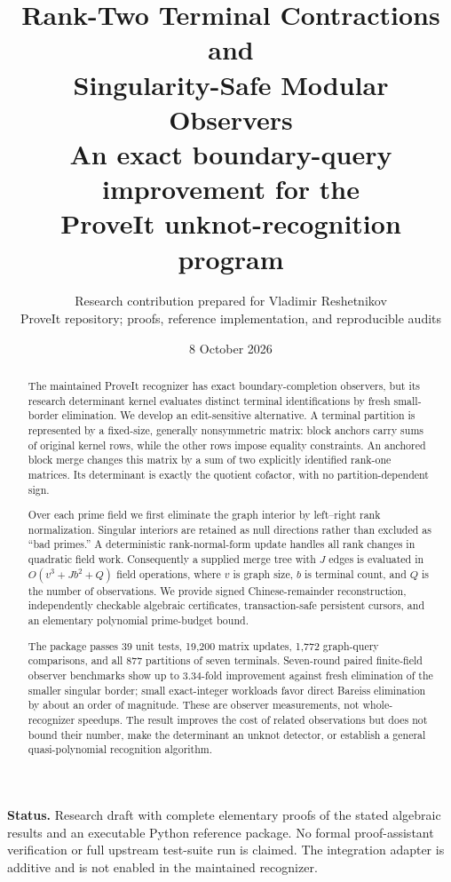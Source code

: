 \documentclass[11pt,letterpaper]{article}
\title{\textbf{Rank-Two Terminal Contractions and\\ Singularity-Safe Modular Observers}\\[0.5em]
\large An exact boundary-query improvement for the\\ ProveIt unknot-recognition program}
\author{Research contribution prepared for Vladimir Reshetnikov\\
\small ProveIt repository; proofs, reference implementation, and reproducible audits}
\date{8 October 2026}
\theoremstyle{definition}\newtheorem{definition}[theorem]{Definition}
\theoremstyle{remark}\newtheorem{remark}[theorem]{Remark}
\begin{document}
\maketitle
\begin{abstract}
The maintained ProveIt recognizer has exact boundary-completion observers, but its research determinant kernel evaluates distinct terminal identifications by fresh small-border elimination. We develop an edit-sensitive alternative. A terminal partition is represented by a fixed-size, generally nonsymmetric matrix: block anchors carry sums of original kernel rows, while the other rows impose equality constraints. An anchored block merge changes this matrix by a sum of two explicitly identified rank-one matrices. Its determinant is exactly the quotient cofactor, with no partition-dependent sign.

Over each prime field we first eliminate the graph interior by left--right rank normalization. Singular interiors are retained as null directions rather than excluded as ``bad primes.'' A deterministic rank-normal-form update handles all rank changes in quadratic field work. Consequently a supplied merge tree with $J$ edges is evaluated in $O(v^3+Jb^2+Q)$ field operations, where $v$ is graph size, $b$ is terminal count, and $Q$ is the number of observations. We provide signed Chinese-remainder reconstruction, independently checkable algebraic certificates, transaction-safe persistent cursors, and an elementary polynomial prime-budget bound.

The package passes 39 unit tests, 19,200 matrix updates, 1,772 graph-query comparisons, and all 877 partitions of seven terminals. Seven-round paired finite-field observer benchmarks show up to $3.34$-fold improvement against fresh elimination of the smaller singular border; small exact-integer workloads favor direct Bareiss elimination by about an order of magnitude. These are observer measurements, not whole-recognizer speedups. The result improves the cost of related observations but does not bound their number, make the determinant an unknot detector, or establish a general quasi-polynomial recognition algorithm.
\end{abstract}
\vspace{0.5em}
\noindent\textbf{Status.} Research draft with complete elementary proofs of the stated algebraic results and an executable Python reference package. No formal proof-assistant verification or full upstream test-suite run is claimed. The integration adapter is additive and is not enabled in the maintained recognizer.
\newpage
\tableofcontents
\newpage
\end{document}
